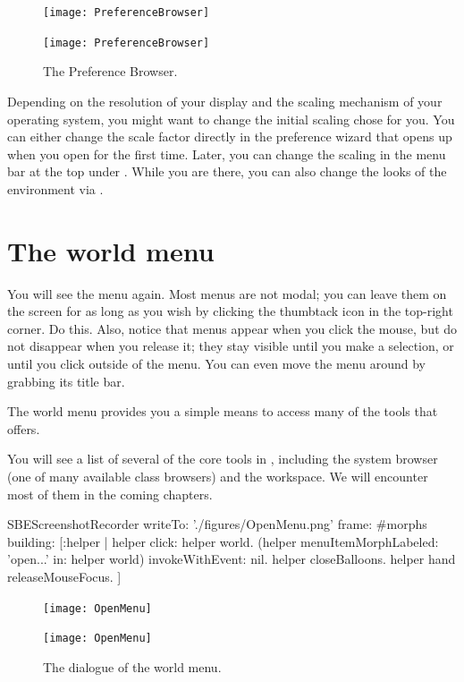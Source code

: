\documentclass[a4paper,10pt,twoside]{book}
\begin{document}
\begin{figure}[htb]
\ifluluelse
	{\centerline {\texttt{[image: PreferenceBrowser]}}}
	{\centerline {\texttt{[image: PreferenceBrowser]}}}
\caption{The Preference Browser.\label{fig:prefBrowser}}
\end{figure}

Depending on the resolution of your display and the scaling mechanism of your operating system, you might want to change the initial scaling \sq chose for you.
You can either change the scale factor directly in the preference wizard that opens up when you open \sq for the first time.
Later, you can change the scaling in the menu bar at the top under .
While you are there, you can also change the looks of the environment via .

\section{The world menu}

You will see the  menu again.
Most \sq menus are not modal; you can leave them on the screen for as long as you wish by clicking the thumbtack icon in the top-right corner.
Do this.
Also, notice that menus appear when you click the mouse, but do not disappear when you release it; they stay visible until you make a selection, or until you click outside of the menu.
You can even move the menu around by grabbing its title bar.

The world menu provides you a simple means to access many of the tools that \sq offers.

You will see a list of several of the core tools in \sq, including the system browser (one of many available class browsers) and the workspace.
We will encounter most of them in the coming chapters.

\begin{ExecuteSmalltalkScript}
SBEScreenshotRecorder writeTo: './figures/OpenMenu.png' frame: #morphs building: [:helper |
  helper click: helper world.
  (helper menuItemMorphLabeled: 'open...' in: helper world) invokeWithEvent: nil.
  helper closeBalloons.
  helper hand releaseMouseFocus.
]
\end{ExecuteSmalltalkScript}

\begin{figure}[htb]
\ifluluelse
	{\centerline {\texttt{[image: OpenMenu]}}}
	{\centerline {\texttt{[image: OpenMenu]}}}
\caption{The  dialogue of the world menu.\label{fig:openmenu}}
\end{figure}
\end{document}
